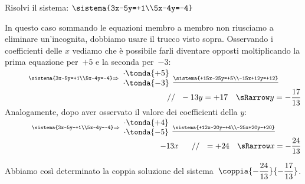 \begin{esempio}{}{}
Risolvi il sistema: \quad 
\(\sistema{3x-5y=+1\\5x-4y=-4}\)

In questo caso sommando le equazioni membro a membro non riusciamo a 
eliminare un'incognita, dobbiamo usare il trucco visto sopra.
Osservando i coefficienti delle \(x\) vediamo che è possibile farli 
diventare opposti moltiplicando la prima equazione per~\(+5\) e la 
seconda per~\(-3\):\\[+.5em]
\hspace*{-10mm}\(\stackrel{\sistema{3x-5y=+1\\5x-4y=-4}\Rightarrow
  \begin{array}{l}\cdot \tonda{+5}\\ \cdot \tonda{-3}\end{array}
  \underline{\sistema{+15x-25y=+5\\-15x+12y=+12}}}
  {\qquad \qquad \qquad \qquad \qquad \qquad \qquad \qquad \qquad \qquad 
   // ~~ -13y  =+17 \quad \sRarrow y=-\dfrac{17}{13}}\)
Analogamente, dopo aver osservato il valore dei coefficienti della 
\(y\):\\[+.5em]
\hspace*{-10mm}\(\stackrel{\sistema{3x-5y=+1\\5x-4y=-4}\Rightarrow
  \begin{array}{l}\cdot \tonda{+4}\\ \cdot \tonda{-5}\end{array}
  \underline{\sistema{+12x-20y=+4\\-25x+20y=+20}}}
  {\qquad \qquad \qquad \qquad \qquad \qquad \qquad \qquad \qquad 
   ~~~~~ -13x ~~~~~ // ~~ =+24 \quad \sRarrow x=-\dfrac{24}{13}}\)

Abbiamo così determinato la coppia soluzione del 
sistema~\(\coppia{-\dfrac{24}{13}}{-\dfrac{17}{13}}\).
\end{esempio}

